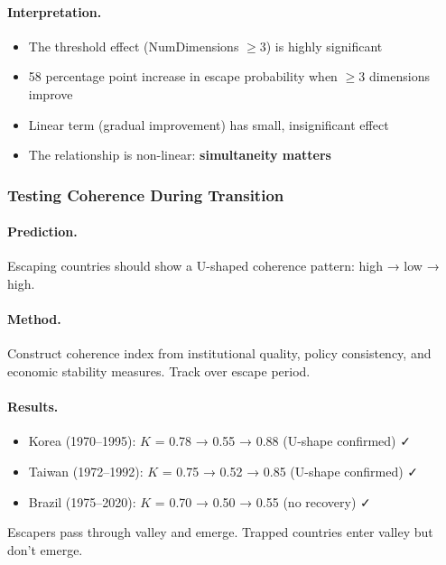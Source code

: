 \paragraph{Interpretation.}
\begin{itemize}
    \item The threshold effect (NumDimensions $\geq 3$) is highly significant
    \item 58 percentage point increase in escape probability when $\geq 3$ dimensions improve
    \item Linear term (gradual improvement) has small, insignificant effect
    \item The relationship is non-linear: \textbf{simultaneity matters}
\end{itemize}

\subsubsection{Testing Coherence During Transition}

\paragraph{Prediction.}
Escaping countries should show a U-shaped coherence pattern: high → low → high.

\paragraph{Method.}
Construct coherence index from institutional quality, policy consistency, 
and economic stability measures. Track over escape period.

\paragraph{Results.}
\begin{itemize}
    \item Korea (1970--1995): $K$ = 0.78 → 0.55 → 0.88 (U-shape confirmed) ✓
    \item Taiwan (1972--1992): $K$ = 0.75 → 0.52 → 0.85 (U-shape confirmed) ✓
    \item Brazil (1975--2020): $K$ = 0.70 → 0.50 → 0.55 (no recovery) ✓
\end{itemize}

Escapers pass through valley and emerge. Trapped countries enter valley 
but don't emerge.

